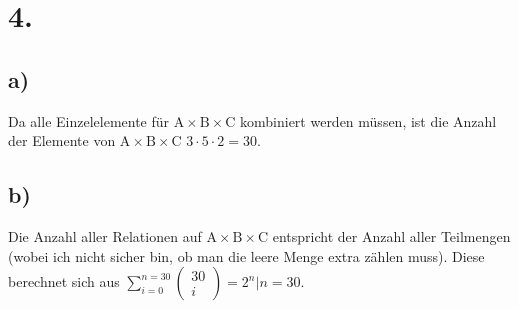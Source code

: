 \documentclass[a4paper]{scrartcl}
\begin{document}
	
\section{4.}	
	\subsection{a)}
		Da alle Einzelelemente für \(\text{A}\times\text{B}\times\text{C}\) kombiniert werden müssen, 
		ist die Anzahl der Elemente von \(\text{A}\times\text{B}\times\text{C}\) \(3\cdot 5 \cdot 
		2=30\).

	\subsection{b)}
		Die Anzahl aller Relationen auf \(\text{A}\times\text{B}\times\text{C}\) entspricht der 
		Anzahl aller Teilmengen (wobei ich nicht sicher bin, ob man die leere Menge extra zählen 
		muss). Diese berechnet sich aus \(\sum\limits_{i=0}^{n=30}\begin{pmatrix}
		30\\i
		\end{pmatrix}= 2^n |n=30\).
	
	
\end{document}
